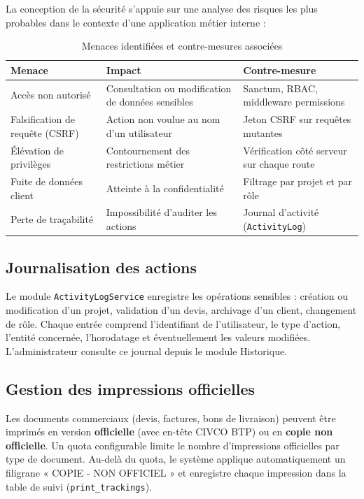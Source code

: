 La conception de la sécurité s'appuie sur une analyse des risques les plus probables
dans le contexte d'une application métier interne :

\begin{table}[H]
\caption{Menaces identifiées et contre-mesures associées}
\label{tab:security}
\centering
\small
\begin{tabular}{|p{4cm}|p{4.5cm}|p{5cm}|}
\hline
\textbf{Menace} & \textbf{Impact} & \textbf{Contre-mesure} \\
\hline
Accès non autorisé & Consultation ou modification de données sensibles & Sanctum, RBAC, middleware permissions \\
\hline
Falsification de requête (CSRF) & Action non voulue au nom d'un utilisateur & Jeton CSRF sur requêtes mutantes \\
\hline
Élévation de privilèges & Contournement des restrictions métier & Vérification côté serveur sur chaque route \\
\hline
Fuite de données client & Atteinte à la confidentialité & Filtrage par projet et par rôle \\
\hline
Perte de traçabilité & Impossibilité d'auditer les actions & Journal d'activité (\texttt{ActivityLog}) \\
\hline
\end{tabular}
\end{table}

\subsection{Journalisation des actions}

Le module \texttt{ActivityLogService} enregistre les opérations sensibles :
création ou modification d'un projet, validation d'un devis, archivage d'un client,
changement de rôle. Chaque entrée comprend l'identifiant de l'utilisateur, le type
d'action, l'entité concernée, l'horodatage et éventuellement les valeurs modifiées.
L'administrateur consulte ce journal depuis le module Historique.

\subsection{Gestion des impressions officielles}

Les documents commerciaux (devis, factures, bons de livraison) peuvent être
imprimés en version \textbf{officielle} (avec en-tête CIVCO BTP) ou en
\textbf{copie non officielle}. Un quota configurable limite le nombre d'impressions
officielles par type de document. Au-delà du quota, le système applique
automatiquement un filigrane « COPIE - NON OFFICIEL » et enregistre chaque
impression dans la table de suivi (\texttt{print\_trackings}).

